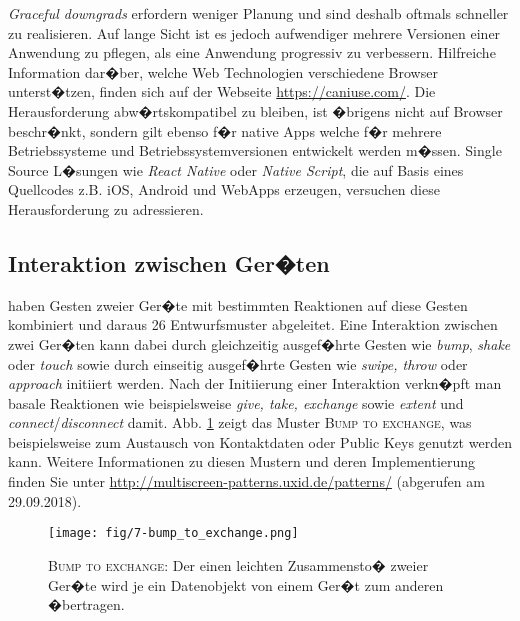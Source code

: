\textit{Graceful downgrads} erfordern weniger Planung und sind deshalb oftmals schneller zu realisieren. Auf lange Sicht ist es jedoch aufwendiger mehrere Versionen einer Anwendung zu pflegen, als eine Anwendung progressiv zu verbessern. Hilfreiche Information dar�ber, welche Web Technologien verschiedene Browser unterst�tzen, finden sich auf der Webseite \url{https://caniuse.com/}. Die Herausforderung abw�rtskompatibel zu bleiben, ist �brigens nicht auf Browser beschr�nkt, sondern gilt ebenso f�r native Apps welche f�r mehrere Betriebssysteme und Betriebssystemversionen entwickelt werden m�ssen. Single Source L�sungen wie \textit{React Native} oder \textit{Native Script}, die auf Basis eines Quellcodes z.B. iOS, Android und WebApps erzeugen, versuchen diese Herausforderung zu adressieren.


\subsection{Interaktion zwischen Ger�ten}

\citet{Madden2018} haben Gesten zweier Ger�te mit bestimmten Reaktionen auf diese Gesten kombiniert und daraus 26 Entwurfsmuster abgeleitet. Eine Interaktion zwischen zwei Ger�ten kann dabei durch gleichzeitig ausgef�hrte Gesten wie \textit{bump}, \textit{shake} oder \textit{touch} sowie durch einseitig ausgef�hrte Gesten wie \textit{swipe, throw} oder \textit{approach} initiiert werden. 
Nach der Initiierung einer Interaktion verkn�pft man basale Reaktionen wie beispielsweise \textit{give, take, exchange} sowie \textit{extent} und \textit{connect}/\textit{disconnect} damit. Abb. \ref{deviceinteraction} zeigt das Muster \textsc{Bump to exchange}, was beispielsweise zum Austausch von Kontaktdaten oder Public Keys genutzt werden kann. Weitere Informationen zu diesen Mustern und deren Implementierung finden Sie unter \url{http://multiscreen-patterns.uxid.de/patterns/} (abgerufen am 29.09.2018).

\begin{figure}
  \texttt{[image: fig/7-bump\_to\_exchange.png]}\\
  \caption{\textsc{Bump to exchange}: Der einen leichten Zusammensto� zweier Ger�te wird je ein Datenobjekt von einem Ger�t zum anderen �bertragen.}
\label{deviceinteraction}
\end{figure}


